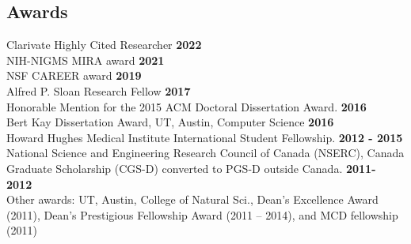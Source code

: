 \documentclass[margin,line,letterpaper]{resume}
\begin{document}
\begin{resume}
    \section{\mysidestyle Awards}
    Clarivate Highly Cited Researcher \hfill \textbf{2022}\vspace{1mm}\\
    NIH-NIGMS MIRA award \hfill \textbf{ 2021}\vspace{1mm}\\
    NSF CAREER award \hfill \textbf{ 2019}\vspace{1mm}\\
    Alfred P. Sloan Research Fellow\hfill \textbf{ 2017}\vspace{1mm}\\
    Honorable Mention for the 2015 ACM Doctoral Dissertation Award.\hfill \textbf{ 2016}\vspace{1mm}\\
     Bert Kay Dissertation Award, UT,  Austin, Computer Science\hfill \textbf{ 2016}\vspace{1mm}\\
     Howard Hughes Medical Institute International Student Fellowship. \hfill \textbf{2012 - 2015}\vspace{1mm}\\
     National Science and Engineering Research Council of Canada (NSERC), 
      Canada Graduate Scholarship (CGS-D) converted to PGS-D outside Canada. \hfill \textbf{2011- 2012} \\
     Other awards: UT,  Austin, College of Natural Sci., Dean's Excellence Award (2011), Dean's Prestigious Fellowship Award (2011 --  2014), and MCD fellowship (2011) %
    
    
    

\end{resume}
\end{document}
